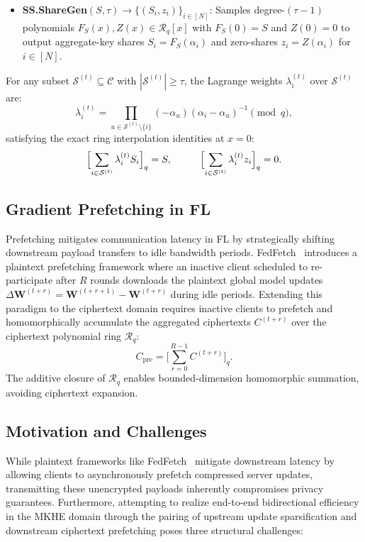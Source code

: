 \begin{itemize}[leftmargin=*]
\item \textbf{SS.ShareGen}$(S, \tau) \to \{(S_i, z_i)\}_{i \in [N]}$: Samples degree-$(\tau-1)$ polynomials $F_S(x), Z(x) \in \mathcal{R}_q[x]$ with $F_S(0) = S$ and $Z(0) = 0$ to output aggregate-key shares $S_i = F_S(\alpha_i)$ and zero-shares $z_i = Z(\alpha_i)$ for $i \in [N]$.
\end{itemize}
For any subset $\mathcal{S}^{(t)} \subseteq \mathcal{C}$ with $|\mathcal{S}^{(t)}| \ge \tau$, the Lagrange weights $\lambda_i^{(t)}$ over $\mathcal{S}^{(t)}$ are:
\begin{equation}
\label{eq:lagrange_weight}
\lambda_i^{(t)} = \prod_{u \in \mathcal{S}^{(t)} \setminus \{i\}} (-\alpha_u)(\alpha_i - \alpha_u)^{-1} \pmod q,
\end{equation}
satisfying the exact ring interpolation identities at $x = 0$:
\begin{equation}
\label{eq:shamir_identities}
\begin{aligned}
&\Bigl[\sum_{i \in \mathcal{S}^{(t)}} \lambda_i^{(t)} S_i\Bigr]_q = S, \qquad 
&\Bigl[\sum_{i \in \mathcal{S}^{(t)}} \lambda_i^{(t)} z_i\Bigr]_q = 0.
\end{aligned}
\end{equation}

\subsection{Gradient Prefetching in FL}
Prefetching mitigates communication latency in FL by strategically shifting downstream payload transfers to idle bandwidth periods. FedFetch~\cite{yan2025fedfetch} introduces a plaintext prefetching framework where an inactive client scheduled to re-participate after $R$ rounds downloads the plaintext global model updates $\Delta\mathbf{W}^{(t+r)} = \mathbf{W}^{(t+r+1)} - \mathbf{W}^{(t+r)}$ during idle periods. Extending this paradigm to the ciphertext domain requires inactive clients to prefetch and homomorphically accumulate the aggregated ciphertexts $C^{(t+r)}$ over the ciphertext polynomial ring $\mathcal{R}_q$:
\begin{equation}
\label{eq:ciphertext_prefetch}
C_{\mathrm{pre}} = \Biggl[\sum_{r=0}^{R-1} C^{(t+r)}\Biggr]_q.
\end{equation}
The additive closure of $\mathcal{R}_q$ enables bounded-dimension homomorphic summation, avoiding ciphertext expansion.

\subsection{Motivation and Challenges}
\label{sec:motivation}
While plaintext frameworks like FedFetch~\cite{yan2025fedfetch} mitigate downstream latency by allowing clients to asynchronously prefetch compressed server updates, transmitting these unencrypted payloads inherently compromises privacy guarantees. Furthermore, attempting to realize end-to-end bidirectional efficiency in the MKHE domain through the pairing of upstream update sparsification and downstream ciphertext prefetching poses three structural challenges:

